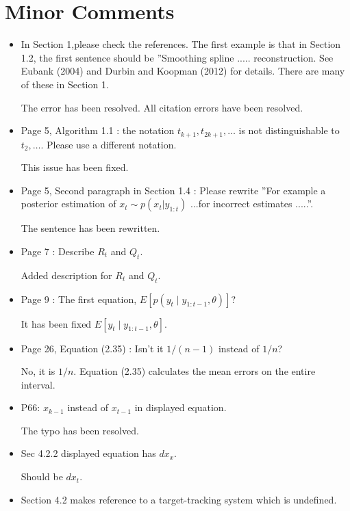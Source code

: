 \documentclass[a4paper,18pt]{extarticle}
\begin{document}
\section{Minor Comments}

\begin{itemize}
	\item In Section 1,please check the references. The first example is that in Section 1.2, the first sentence should be ”Smoothing spline ..... reconstruction. See Eubank (2004) and Durbin and Koopman (2012) for details. There are many of these in Section 1. 

	The error has been resolved. All citation errors have been resolved. 
	
	\item  Page 5, Algorithm 1.1 : the notation $t_{k+1}, t_{2k+1},\ldots$ is not distinguishable to $t_2, \ldots$. Please use a different notation. 

	This issue has been fixed.
	
	\item  Page 5, Second paragraph in Section 1.4 : Please rewrite ”For example a posterior estimation of $x_t\sim p(x_t|y_{1:t})$ ...for incorrect estimates .....”. 
	
	The sentence has been rewritten.
	
	\item Page 7 : Describe $R_t$ and $Q_t$.
	
	Added description for $R_t$ and $Q_t$.	
	
	\item Page 9 : The first equation, $E[p(y_t\mid y_{1:t−1},\theta)]$?
	
	It has been fixed $E[y_t\mid y_{1:t−1},\theta]$. 
	

	\item Page 26, Equation (2.35) : Isn’t it $1/(n − 1)$ instead of $1/n$?
	
	No, it is $1/n$. Equation (2.35) calculates the mean errors on the entire interval.
	
	\item P66: $x_{k−1}$ instead of $x_{t−1}$ in displayed equation.
	
	The typo has been resolved.
	
	\item Sec 4.2.2 displayed equation has $dx_x$.
	
	Should be $dx_t$.
	
	\item  Section 4.2 makes reference to a target-tracking system which is undefined.
	

\end{itemize}
\end{document}
